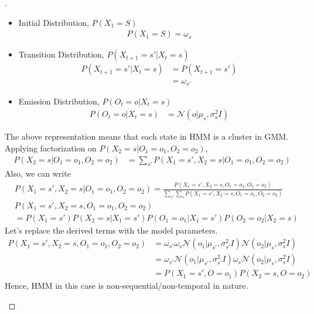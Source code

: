 \documentclass[a4paper, 12pt]{article}
\begin{document}
\begin{proof}[]
\begin{enumerate}[label={\color{blue}{\textbf{2.\arabic*})}}]
        \begin{itemize}
         \item Initial Distribution, $P(X_1=S)$
         \begin{align*}
             P(X_1=S) = \omega_s
         \end{align*}
         \item Transition Distribution, $P(X_{t+1}=s' | X_t=s)$
         \begin{align*}
             P(X_{t+1}=s'|X_t=s) 
             &=P(X_{t+1}
             = s')\\ 
             & = \omega_{s'}
         \end{align*}
         \item Emission Distribution, $P(O_{t}=o | X_t=s)$
         \begin{align*}
             P(O_{t}=o | X_t=s)  
             &=\mathcal{N}(o|\mu_s,\sigma^2_{s}I)
         \end{align*}
     \end{itemize}
     The above representation means that each state in HMM is a cluster in GMM.\\
     Applying factorization on $P(X_2=s| O_1=o_1,O_2=o_2)$,
     \begin{align*}
         P(X_2=s| O_1=o_1,O_2=o_2) & = \sum\nolimits_{s'}P(X_1=s', X_2=s| O_1=o_1,O_2=o_2) \tag{HMM Factorisation}
     \end{align*}
     Also, we can write
     \begin{align*}
         &P(X_1=s', X_2=s| O_1=o_1,O_2=o_2)  =\frac{P(X_1=s', X_2=s, O_1=o_1,O_2=o_2)}{\sum\nolimits_{s'}\sum\nolimits_{s}P(X_1=s', X_2=s,O_1=o_1,O_2=o_2)}\\
         &P(X_1=s', X_2=s, O_1=o_1,O_2=o_2)\\ 
          &= P(X_1=s')P(X_2=s| X_1=s')P(O_1=o_1|X_1=s')P(O_2=o_2|X_2=s)
     \end{align*}
     Let's replace the derived terms with the model parameters.
     \begin{align*}
         P(X_1=s', X_2=s, O_1=o_1,O_2=o_2) &=\omega_{s'}\omega_{s}\mathcal{N}(o_1 | \mu_{s'},\sigma^2_{s'}I)\mathcal{N}(o_2 | \mu_{s},\sigma^2_{s}I)\\
         &=\omega_{s'}\mathcal{N}(o_1 | \mu_{s'},\sigma^2_{s'}I)\omega_{s}\mathcal{N}(o_2 | \mu_{s},\sigma^2_{s}I)\\
         &=P(X_1=s',O =o_1)P(X_2=s,O =o_2)
     \end{align*}
     Hence, HMM in this case is non-sequential/non-temporal in nature. \\

\end{enumerate}
\end{proof}
\end{document}
